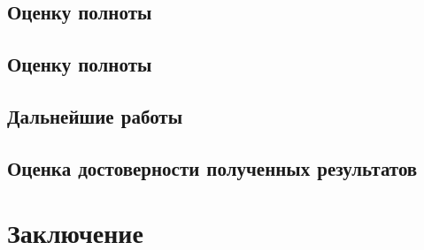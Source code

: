 \documentclass{mipt-thesis-ms}
\begin{document}
\section{Оценку полноты}

\section{Оценку полноты}

\section{Дальнейшие работы}

\section{Оценка достоверности полученных результатов}

\chapter{Заключение}


\backmatter

\printbib
\end{document}
